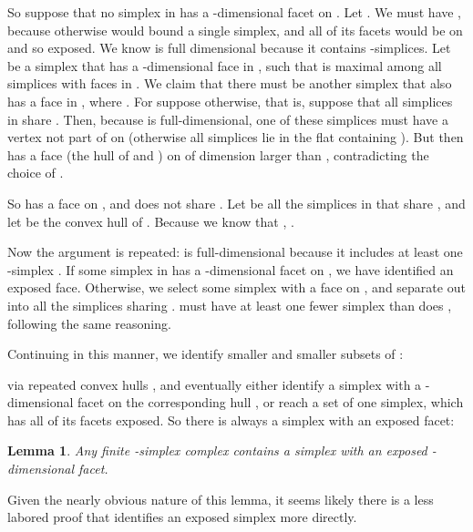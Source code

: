 \pdfoutput=1  \documentclass[]{article}
\newtheorem{lemma}{Lemma}
\newcommand{\lemlab}[1]{\label{lemma:#1}}
\begin{document}
So suppose that no simplex in  has a -dimensional facet on .
Let .
We must have , because otherwise  would bound a single
simplex,
and all of its facets would be on  and so exposed.
We know  is full dimensional because it contains -simplices.
Let  be a simplex that has a -dimensional face  in
, such that
 is maximal among all simplices with faces in .
We claim that there must be another simplex  that also has a face  in
, where .
For suppose otherwise, that is, suppose that all simplices in 
share .  Then, because  is full-dimensional,
one of these simplices  must have a vertex  not part of 
on 
(otherwise all simplices lie in the flat containing ).
But then  has a face (the hull of  and )
on  of dimension larger than ,
contradicting the choice of .

So  has a face on , and  does not share .
Let  be all the simplices in  that share
, and
let  be the convex hull of .
Because we know that ,
.

Now the argument is repeated:  is full-dimensional because it
includes at least one -simplex .
If some simplex in  has a -dimensional facet on
,
we have identified an exposed face.
Otherwise, we select some simplex  with a face  on ,
and separate out into  all the simplices sharing .
 must have at least one fewer simplex than does ,
following the same reasoning.

Continuing in this manner, we identify smaller and smaller subsets of
:

via repeated convex hulls ,
and eventually either identify a simplex with a -dimensional
facet on
the corresponding hull , or reach a set of one simplex, which
has all of its facets exposed.
So there is always a simplex with an exposed facet:

\begin{lemma}
Any finite -simplex complex contains a simplex with an 
exposed  -dimensional
facet.
\lemlab{exposed}
\end{lemma}
\noindent
Given the nearly obvious nature of
this lemma, it seems likely there is a less labored proof
that identifies an exposed simplex more directly.
\end{document}
